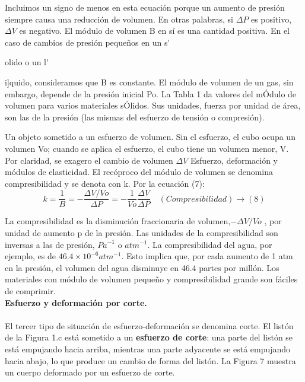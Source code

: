 \documentclass[10pt,a4paper]{article}
\begin{document}
Incluimos un signo de menos en esta ecuaci\'{o}n porque un aumento de presi\'{o}n siempre
causa una reducci\'{o}n de volumen. En otras palabras, si $\Delta P$ es positivo, $\Delta V$ es negativo. El m\'{o}dulo de volumen B en s\'{i} es una cantidad positiva. En el caso de cambios de presi\'{o}n peque\~{n}os en un s\'{olido o un l\'{i]quido, consideramos que B es constante. El m\'{o}dulo de volumen de un gas, sin embargo, depende de la presi\'{o}n inicial Po. La Tabla 1 da valores del m\'{O}dulo de volumen para varios materiales s\'{O}lidos. Sus unidades, fuerza por unidad de \'{a}rea, son las de la presi\'{o}n (las mismas del esfuerzo de tensi\'{o}n o compresi\'{o}n).

Un objeto sometido a un esfuerzo de volumen. Sin el esfuerzo, el cubo ocupa un volumen Vo; cuando se aplica el esfuerzo, el cubo tiene un volumen menor, V. Por claridad, se exager{o} el cambio de volumen $\Delta V$ Esfuerzo, deformaci\'{o}n y m\'{o}dulos de elasticidad. El rec\'{o}proco del m\'{o}dulo de volumen se denomina compresibilidad y se denota con k. Por la ecuaci\'{o}n (7): 
\\
\[k=\frac { 1 }{ B } =-\frac { { \Delta V }/{ Vo } }{ \Delta P } =-\frac { 1 }{ Vo } \frac { \Delta V }{ \Delta P } \quad (Compresibilidad)\longrightarrow (8)\]

La compresibilidad es la disminuci\'{o}n fraccionaria de volumen,${ -\Delta V }/{ Vo }$ , por unidad de aumento p de la presi\'{o}n. Las unidades de la compresibilidad son inversas a las de presi\'{o}n, ${ Pa }^{ -1 }$ o ${ atm }^{ -1 }$. La compresibilidad del agua, por ejemplo, es de $46.4\times { 10 }^{ -6 }{ atm }^{ -1 }$. Esto implica que, por cada aumento de 1 atm en la presi\'{o}n, el volumen del agua disminuye en 46.4 partes por mill\'{o}n. Los materiales con m\'{o}dulo de volumen peque\~{n}o y compresibilidad grande son f\'{a}ciles de comprimir.\\


\textbf{Esfuerzo y deformaci\'{o}n por corte.}\\

\\El tercer tipo de situaci\'{o}n de esfuerzo-deformaci\'{o}n se denomina corte. El list\'{o}n de la Figura 1.c est\'{a} sometido a un \textbf{esfuerzo de corte}: una parte del list\'{o}n se est\'{a} empujando hacia arriba, mientras una parte adyacente se est\'{a} empujando hacia abajo, lo que produce un cambio de forma del list\'{o}n. La Figura 7 muestra un cuerpo deformado por un esfuerzo de corte.\\

}}
\end{document}
